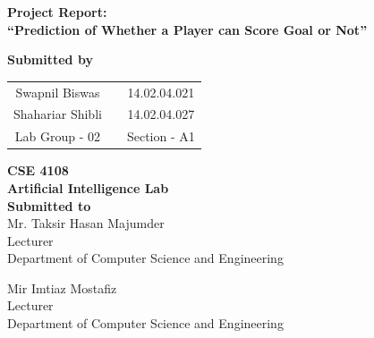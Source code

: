 \documentclass[10pt,a4paper]{article}
\begin{document}
\begin{center}
\LARGE{\textbf{Project Report:}}\\
\LARGE{\textbf{``Prediction of Whether a Player can Score Goal or Not''}}\\[0.5cm]
\vspace{0.8cm}

\Large{\textbf{Submitted by}}
\begin{center}
\begin{tabular}{ c c c }
 Swapnil Biswas & & 14.02.04.021 \\ 
 Shahariar Shibli & & 14.02.04.027\\
 Lab Group - 02 & & Section - A1
\end{tabular}
\end{center}

\vspace{0.8cm}
\Large{\textbf{CSE 4108}}\\
\Large{\textbf{Artificial Intelligence Lab}}\\

\vspace{0.8cm}
\Large{\textbf{Submitted to}}\\[0.4cm]
Mr. Taksir Hasan Majumder\\
Lecturer\\
Department of Computer Science and Engineering

\vspace{0.4cm}
	
Mir Imtiaz Mostafiz\\
Lecturer\\
Department of Computer Science and Engineering\\


\end{center}
\end{document}
